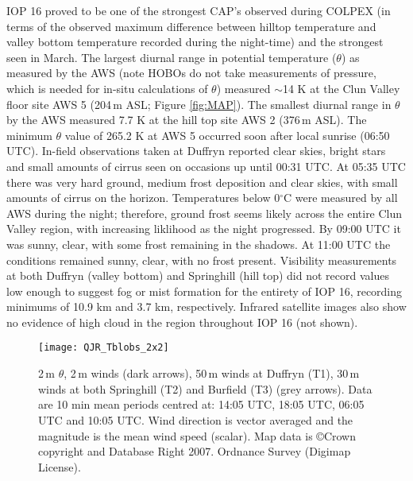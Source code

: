 \documentclass[times]{qjrms4}
\begin{document}
IOP 16 proved to be one of the strongest CAP's observed during COLPEX (in terms of the observed maximum difference between hilltop temperature and valley bottom temperature recorded during the night-time) and the strongest seen in March. The largest diurnal range in potential temperature ($\theta$) as measured by the AWS (note HOBOs do not take measurements of pressure, which is needed for in-situ calculations of $\theta$) measured $\sim$14 K at the Clun Valley floor site AWS 5 (204$\,\mbox{m}$ ASL; Figure \ref{fig:MAP}). The smallest diurnal range in $\theta$ by the AWS measured 7.7 K at the hill top site AWS 2 (376$\,\mbox{m}$ ASL). The minimum $\theta$ value of 265.2 K at AWS 5 occurred soon after local sunrise (06:50 UTC). In-field observations taken at Duffryn reported clear skies, bright stars and small amounts of cirrus seen on occasions up until 00:31 UTC. At 05:35 UTC there was very hard ground, medium frost deposition and clear skies, with small amounts of cirrus on the horizon. Temperatures below 0$^\circ$C were measured by all AWS during the night; therefore, ground frost seems likely across the entire Clun Valley region, with increasing liklihood as the night progressed. By 09:00 UTC it was sunny, clear, with some frost remaining in the shadows. At 11:00 UTC the conditions remained sunny, clear, with no frost present. Visibility measurements at both Duffryn (valley bottom) and Springhill (hill top) did not record values low enough to suggest fog or mist formation for the entirety of IOP 16, recording minimums of 10.9 km and 3.7 km, respectively. Infrared satellite images also show no evidence of high cloud in the region throughout IOP 16 (not shown).
        \begin{figure*}
        \centering
        \texttt{[image: QJR\_Tblobs\_2x2]}
        \caption{2$\,\mbox{m}$ $\theta$, 2$\,\mbox{m}$ winds (dark arrows), 50$\,\mbox{m}$ winds at Duffryn (T1), 30$\,\mbox{m}$ winds at both Springhill (T2) and Burfield (T3) (grey arrows). Data are 10 min mean periods centred at: 14:05 UTC, 18:05 UTC, 06:05 UTC and 10:05 UTC. Wind direction is vector averaged and the magnitude is the mean wind speed (scalar). Map data is \copyright Crown copyright and Database Right 2007. Ordnance Survey (Digimap License).}
        \label{fig:Tblobs}
        \end{figure*}
\end{document}
